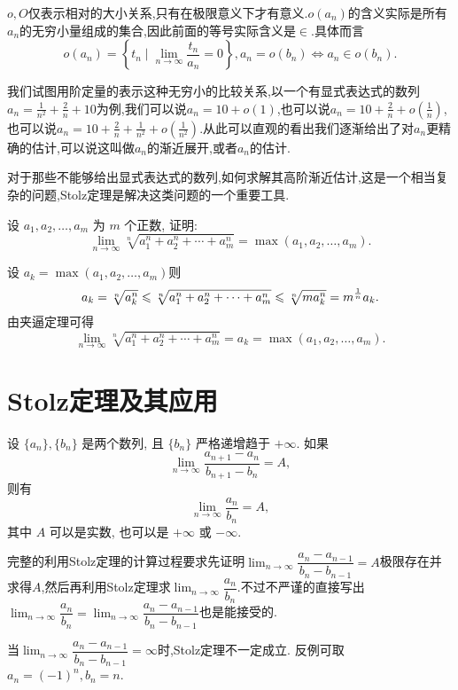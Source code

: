 $o,O$仅表示相对的大小关系,只有在极限意义下才有意义.$o(a_n)$的含义实际是所有$a_n$的无穷小量组成的集合,因此前面的等号实际含义是$\in$.具体而言
$$o(a_n) = \left\{t_n \mid \lim_{n \to \infty} \frac{t_n}{a_n} = 0\right\}, a_n = o(b_n) \Leftrightarrow a_n \in o(b_n).$$

我们试图用阶定量的表示这种无穷小的比较关系,以一个有显式表达式的数列$a_n = \frac{1}{n^2} + \frac{2}{n} + 10$为例,我们可以说$a_n = 10 + o(1)$,也可以说$a_n = 10 + \frac{2}{n} + o(\frac{1}{n})$,也可以说$a_n = 10 + \frac{2}{n} + \frac{1}{n^2} + o(\frac{1}{n^2})$.从此可以直观的看出我们逐渐给出了对$a_n$更精确的估计,可以说这叫做$a_n$的渐近展开,或者$a_n$的估计.

对于那些不能够给出显式表达式的数列,如何求解其高阶渐近估计,这是一个相当复杂的问题,Stolz定理是解决这类问题的一个重要工具.

\begin{exercise}[1.2.16]
    设 $a_1, a_2, \ldots, a_m$ 为 $m$ 个正数, 证明:
    $$
        \lim_{n\to\infty} \sqrt[n]{a_1^n + a_2^n + \cdots + a_m^n} = \max(a_1, a_2, \ldots, a_m).
    $$
\end{exercise}

\begin{solution}
    设 $a_k = \max(a_1, a_2, \ldots, a_m)$则
    $$
        a_k = \sqrt[n]{a_k^n} \leqslant \sqrt[n]{a_1^n + a_2^n + \cdots + a_m^n} \leqslant \sqrt[n]{m a_k^n} = m^{\frac{1}{n}} a_k.
    $$
    由夹逼定理可得
    $$
        \lim_{n\to\infty} \sqrt[n]{a_1^n + a_2^n + \cdots + a_m^n} = a_k = \max(a_1, a_2, \ldots, a_m).
    $$
\end{solution}

\section{Stolz定理及其应用}

\begin{theorem} \label{thm:Stolz_inf}
    设 $\{a_n\}, \{b_n\}$ 是两个数列, 且 $\{b_n\}$ 严格递增趋于 $+\infty$. 如果
    $$ \lim_{n\to\infty} \frac{a_{n+1} - a_n}{b_{n+1} - b_n} = A, $$
    则有
    $$ \lim_{n\to\infty} \frac{a_n}{b_n} = A, $$
    其中 $A$ 可以是实数, 也可以是 $+\infty$ 或 $-\infty$.

    \begin{remark}
        完整的利用Stolz定理的计算过程要求先证明$\lim_{n \to \infty} \dfrac{a_n-a_{n-1}}{b_n-b_{n-1}}=A$极限存在并求得$A$,然后再利用Stolz定理求$\lim_{n \to \infty} \dfrac{a_n}{b_n}$.不过不严谨的直接写出$\lim_{n \to \infty} \dfrac{a_n}{b_n}=\lim_{n \to \infty} \dfrac{a_n-a_{n-1}}{b_n-b_{n-1}}$也是能接受的.
    \end{remark}

    \begin{remark}
        当$\lim_{n \to \infty} \dfrac{a_n-a_{n-1}}{b_n-b_{n-1}}= \infty$时,Stolz定理不一定成立.
        反例可取$a_n = (-1)^n, b_n = n$.
    \end{remark}
\end{theorem}

